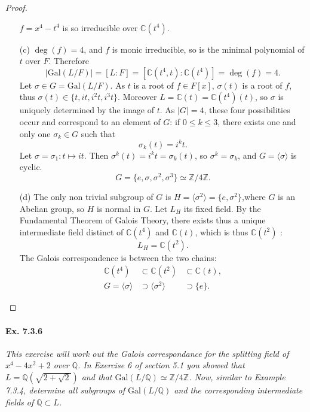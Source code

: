 \documentclass[11pt,a4paper]{article}
\newcommand{\Q}{\mathbb{Q}}
\newcommand{\Z}{\mathbb{Z}}
\newcommand{\C}{\mathbb{C}}
\newcommand{\Gal}{\mathrm{Gal}}
\begin{document}
\begin{proof}
\begin{enumerate}
$f = x^4 - t^4$ is so irreducible over $\C(t^4)$.

\item[(c)]
$\deg(f) = 4$, and $f$ is monic irreducible, so is the minimal polynomial of $t$ over $F$. Therefore
$$\vert \Gal(L/F) \vert= [L:F] = [\C(t^4,t):\C(t^4)] = \deg(f) = 4.$$
Let $\sigma \in G = \Gal(L/F)$. As $t$ is a root of $f \in F[x]$, $\sigma(t)$ is a root of $f$, thus $\sigma(t) \in \{t,it,i^2t,i^3t\}$. Moreover $L = \C(t) = \C(t^4)(t)$, so $\sigma$ is uniquely determined by the image of $t$. As $\vert G \vert =4$, these four possibilities occur and correspond to an element of $G$: if $0 \leq k \leq 3$, there exists one and only one $\sigma_k \in G$ such that 
$$\sigma_k(t) = i^k t.$$
Let $\sigma = \sigma_1 : t \mapsto i t$. Then $\sigma^k(t) = i^kt = \sigma_k(t)$, so $\sigma^k = \sigma_k$, and $G = \langle \sigma \rangle$ is cyclic.
$$G = \{e,\sigma,\sigma^2,\sigma^3\} \simeq \Z/4\Z.$$

\item[(d)] The only non trivial subgroup of $G$ is $H = \langle \sigma^2 \rangle = \{e,\sigma^2\}$,where $G$ is an Abelian group, so $H$ is normal in $G$. Let $L_H$ its fixed field.
By the Fundamental Theorem of Galois Theory, there exists thus a unique intermediate field distinct of $\C(t^4)$ and $\C(t)$, which is thus $\C(t^2)$ :
$$L_H = \C(t^2).$$
The Galois correspondence is between the two chains:
$$ 
\begin{array}{lll}
\C(t^4) &\subset \C(t^2) &\subset \C(t),\\
G = \langle \sigma \rangle &\supset \langle \sigma^2 \rangle &\supset \{e\}.
\end{array}
$$
\end{enumerate}
\end{proof}

\paragraph{Ex. 7.3.6}
{\it This exercise will work out the Galois correspondance for the splitting field of $x^4 - 4x^2 + 2$ over $\Q$. In Exercise 6 of section 5.1 you showed that $L = \Q(\sqrt{2+\sqrt{2}})$ and that $\Gal(L/\Q) \simeq \Z/4\Z$. Now, similar to Example 7.3.4, determine all subgroups of $\Gal(L/\Q)$ and the corresponding intermediate fields of $\Q \subset L$.
}
\end{document}
